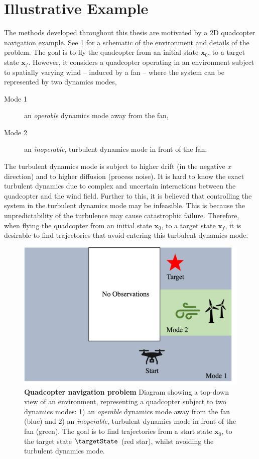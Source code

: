 \documentclass{mimosis-class/mimosis}
\numberwithin{equation}{chapter}
\newcommand{\state}{\ensuremath{\mathbf{x}}}
\begin{document}
\section{Illustrative Example \label{illustrative_example}}
\label{sec:org8456aa7}
The methods developed throughout this thesis are motivated by a 2D quadcopter navigation example.
See \cref{fig-problem-statement} for a schematic of the environment and details of the problem.
The goal is to fly the quadcopter from an initial state \(\state_0\), to a target state \(\state_{f}\).
However, it considers a quadcopter operating in an environment subject to spatially varying wind --
induced by a fan -- where the system can be represented by two dynamics modes,
\begin{description}
\item[{Mode 1}] an \emph{operable} dynamics mode away from the fan,
\item[{Mode 2}] an \emph{inoperable}, turbulent dynamics mode in front of the fan.
\end{description}
The turbulent dynamics mode is subject to higher drift (in the negative \(x\) direction) and
to higher diffusion (process noise).
It is hard to know the exact turbulent dynamics due to complex and uncertain interactions between the
quadcopter and the wind field.
Further to this, it is believed that controlling the system in the turbulent dynamics mode may be infeasible.
This is because the unpredictability of the turbulence may cause catastrophic failure.
Therefore, when flying the quadcopter from an initial state \(\state_0\), to a target state \(\state_{f}\),
it is desirable to find trajectories that avoid entering this turbulent dynamics mode.
\begin{figure}[t!]
\centering
\includegraphics[width=1.0\textwidth]{./images/quadcopter-domain-collocation-ppt.png}
\caption[Quadcopter navigation problem]{\label{fig-problem-statement}\textbf{Quadcopter navigation problem}
Diagram showing a top-down view of an environment, representing a quadcopter subject to two dynamics modes:
1) an \textit{operable} dynamics mode away from the fan (blue) and 2) an \textit{inoperable}, turbulent dynamics mode in front of the fan (green).
The goal is to find trajectories from a start state $\state_0$, to the target state $\targetState$ (red star),
whilst avoiding the turbulent dynamics mode.}
\end{figure}
\end{document}
